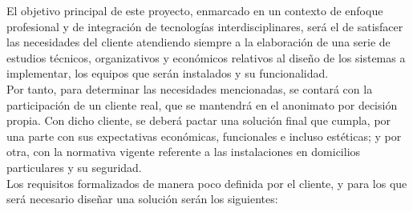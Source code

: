 El objetivo principal de este proyecto, enmarcado en un contexto de enfoque profesional y de integración de tecnologías interdisciplinares, será el de satisfacer las necesidades del cliente atendiendo siempre a la elaboración de una serie de estudios técnicos, organizativos y económicos relativos al diseño de los sistemas a implementar, los equipos que serán instalados y su funcionalidad. \\
Por tanto, para determinar las necesidades mencionadas, se contará con la participación de un cliente real, que se mantendrá en el anonimato por decisión propia. Con dicho cliente, se deberá pactar una solución final que cumpla, por una parte con sus expectativas económicas, funcionales e incluso estéticas; y por otra, con la normativa vigente referente a las instalaciones en domicilios particulares y su seguridad.\\ 
Los requisitos formalizados de manera poco definida por el cliente, y para los que será necesario diseñar una solución serán los siguientes:

